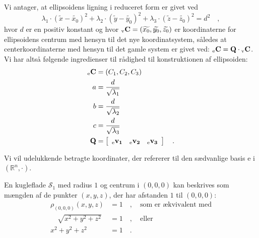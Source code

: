 Vi antager, at ellipsoidens ligning i reduceret form er givet ved
\begin{equation}
\lambda_{1}\cdot(\widetilde{x}- \widetilde{x_{0}})^{2} + \lambda_{2}\cdot(\widetilde{y}- \widetilde{y_{0}})^{2} +\lambda_{3}\cdot(\widetilde{z}- \widetilde{z_{0}})^{2} = d^{2} \quad,
\end{equation}
hvor $d$ er en positiv konstant og hvor ${_\mathrm{v}\mathbf{\mathbf{C}}} = (\widetilde{x_{0}}, \widetilde{y_{0}}, \widetilde{z_{0}})$ er koordinaterne for ellipsoidens centrum med hensyn til det nye koordinatsystem, således at centerkoordinaterne med hensyn til det gamle system er givet ved:
${_\mathrm{e}\mathbf{\mathbf{C}}} = \mathbf{Q}\cdot {_\mathrm{v}\mathbf{\mathbf{C}}}$.
 Vi har altså følgende ingredienser til rådighed til konstruktionen af ellipsoiden:
\begin{equation}
\begin{aligned}
{_\mathrm{e}\mathbf{\mathbf{C}}} &= (C_{1}, C_{2}, C_{3}) \\
a&= \frac{d}{\sqrt{\lambda_{1}}} \\
b&= \frac{d}{\sqrt{\lambda_{2}}} \\
c&= \frac{d}{\sqrt{\lambda_{3}}} \\
\mathbf{Q} &= \left[
               \begin{array}{ccc}
                 {_\mathrm{e}\mathbf{\mathbf{v}_{1}}} &   {_\mathrm{e}\mathbf{\mathbf{v}_{2}}} &   {_\mathrm{e}\mathbf{\mathbf{v}_{3}}}\\
               \end{array}
             \right] \quad .
\end{aligned}
\end{equation}

Vi vil udelukkende betragte koordinater, der refererer til den sædvanlige basis e i $(\mathbb{R}^{n}, \bm{\cdot})$.

En kugleflade $\mathcal{S}_{1}$ med radius $1$ og centrum i $(0,0,0)$ kan  beskrives som mængden af de punkter $(x,y,z)$, der har afstanden $1$ til $(0,0,0)$:
\begin{equation} \label{eqSph}
\begin{aligned}
\rho_{(0,0,0)}(x,y,z) &= 1 \quad , \quad \textrm{som er ækvivalent med} \\
\quad \sqrt{x^{2} + y^{2} + z^{2}} &= 1 \quad , \quad \textrm{eller} \\
x^{2} + y^{2} + z^{2} &= 1 \quad.
\end{aligned}
\end{equation}

